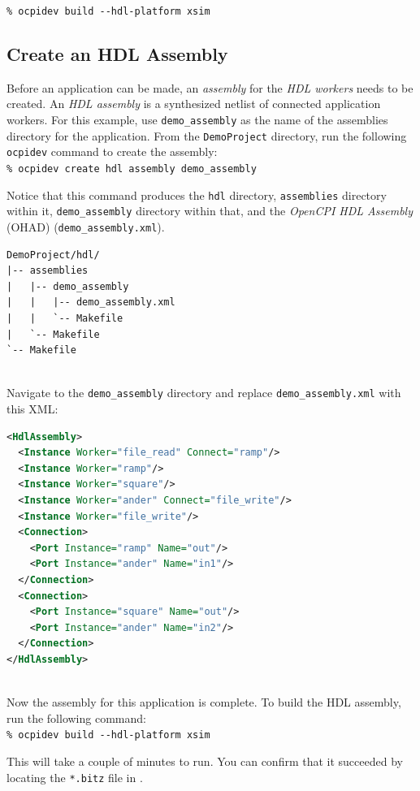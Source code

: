 \forceindent\verb+% ocpidev build --hdl-platform xsim+
\OcpidevBuild

\subsection{Create an HDL Assembly}
Before an application can be made, an \textit{assembly} for the \textit{HDL workers} needs to be created. An \textit{HDL assembly} is a synthesized netlist of connected application workers. For this example, use \verb+demo_assembly+ as the name of the assemblies directory for the application. From the \verb+DemoProject+ directory, run the following \verb+ocpidev+ command to create the assembly:\\

\forceindent\verb+% ocpidev create hdl assembly demo_assembly+\\
\OcpidevCreate{}

\bstart
Notice that this command produces the \verb+hdl+ directory, \verb+assemblies+ directory within it, \verb+demo_assembly+ directory within that, and the \textit{OpenCPI HDL Assembly} (OHAD) (\verb+demo_assembly.xml+).

\begin{verbatim}
DemoProject/hdl/
|-- assemblies
|   |-- demo_assembly
|   |   |-- demo_assembly.xml
|   |   `-- Makefile
|   `-- Makefile
`-- Makefile
\end{verbatim}
\bend
\pagebreak[1]
~\\
Navigate to the \verb+demo_assembly+ directory and replace \verb+demo_assembly.xml+ with this XML:
\begin{lstlisting}[language=xml]
<HdlAssembly>
  <Instance Worker="file_read" Connect="ramp"/>
  <Instance Worker="ramp"/>
  <Instance Worker="square"/>
  <Instance Worker="ander" Connect="file_write"/>
  <Instance Worker="file_write"/>
  <Connection>
    <Port Instance="ramp" Name="out"/>
    <Port Instance="ander" Name="in1"/>
  </Connection>
  <Connection>
    <Port Instance="square" Name="out"/>
    <Port Instance="ander" Name="in2"/>
  </Connection>
</HdlAssembly>
\end{lstlisting}
~\\
Now the assembly for this application is complete. To build the HDL assembly, run the following command:\\

\forceindent\verb+% ocpidev build --hdl-platform xsim+\\
\OcpidevBuild

This will take a couple of minutes to run. You can confirm that it succeeded by locating the \texttt{*.bitz} file in .\\
